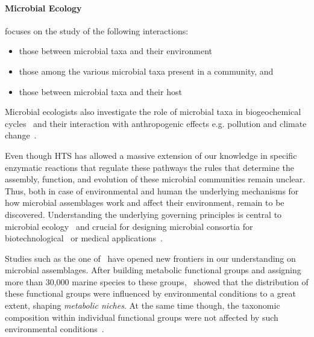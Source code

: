       \paragraph{Microbial Ecology} focuses on the study of the following interactions: 
      \begin{itemize}
         \setlength\itemsep{0.05em}
         \item those between microbial taxa and their environment
         \item those among the various microbial taxa present in a community, and
         \item those between microbial taxa and their host~\citep{isme}
      \end{itemize}

      Microbial ecologists also investigate the role of microbial taxa in 
      biogeochemical cycles~\citep{falkowski2008microbial} and their interaction 
      with anthropogenic effects e.g. pollution and climate change~\citep{cavicchioli2019scientists}.

      Even though HTS has allowed a massive extension of our knowledge in  
      specific enzymatic reactions that regulate these pathways the rules that determine 
      the assembly, function, and evolution of these microbial communities remain unclear. 
      Thus, both in case of environmental and human
      the underlying mechanisms for how microbial assemblages work and affect their environment, remain to be discovered.
      Understanding the underlying governing principles is central to microbial ecology~\citep{giri2021metabolic} and crucial for designing microbial consortia for biotechnological~\citep{giri2020harnessing} or medical applications~\citep{kong2018designing}.

      Studies such as the one of~\citeauthor{louca2016decoupling}
      have opened new frontiers in our understanding on microbial assemblages. 
      After building metabolic functional groups and assigning more than 30,000 marine 
      species to these groups,~\citeauthor{louca2016decoupling} showed 
      that the distribution of these functional groups were influenced by environmental 
      conditions to a great extent, shaping \textit{metabolic niches}.
      At the same time though, the taxonomic composition within individual functional groups
      were not affected by such environmental conditions~\citep{louca2016decoupling}.

